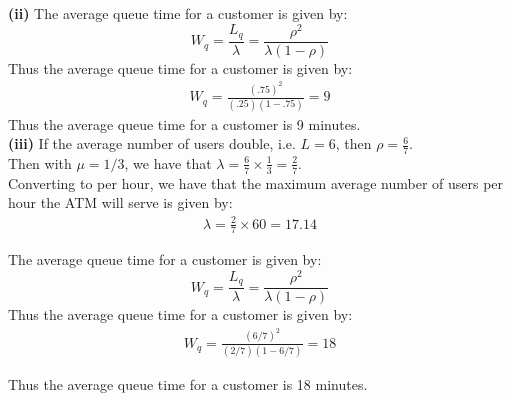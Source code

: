 \documentclass[answers,12pt,addpoints]{exam}
\begin{document}
\begin{questions}
\begin{solution}
    \textbf{(ii)} The average queue time for a customer is given by:
    $$W_q = \frac{L_q}{\lambda} = \frac{\rho^2}{\lambda(1-\rho)}$$
    Thus the average queue time for a customer is given by:
    \begin{align*}
        W_q = \frac{(.75)^2}{(.25)(1-.75)} = 9
    \end{align*}
    Thus the average queue time for a customer is 9 minutes.\\

    \textbf{(iii)} If the average number of users double, i.e. $L = 6$, then $\rho = \frac{6}{7}$.\\
    Then with $\mu = 1/3$, we have that $\lambda = \frac{6}{7} \times \frac{1}{3} = \frac{2}{7}$.\\
    Converting to per hour, we have that the maximum average number of users per hour the ATM will serve is given by:
    \begin{align*}
        \lambda = \frac{2}{7} \times 60 = 17.14
    \end{align*}

    The average queue time for a customer is given by:
    $$W_q = \frac{L_q}{\lambda} = \frac{\rho^2}{\lambda(1-\rho)}$$
    Thus the average queue time for a customer is given by:
    \begin{align*}
        W_q = \frac{(6/7)^2}{(2/7)(1-6/7)} = 18
    \end{align*}

    Thus the average queue time for a customer is 18 minutes.\\


\end{solution}

\end{questions}
\end{document}

